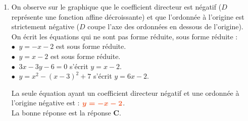 \documentclass[a4paper,11pt]{article}
\begin{document}
\begin{seanceD}{}
\begin{enumerate}
\item On observe sur le graphique que le coefficient directeur est négatif ($D$ représente une fonction affine décroissante) et que l'ordonnée à l'origine est strictement négative ($D$ coupe l'axe des ordonnées en dessous de l'origine).\\On écrit les équations qui ne sont pas forme réduite, sous forme réduite :\\$\bullet\:$ $y=-x-2$ est  sous forme réduite.\\$\bullet\:$ $y=x-2$ est  sous forme réduite.\\$\bullet\:$ $3x-3y-6=0$ s'écrit $y=x-2$.\\$\bullet\:$ $y=x^2-(x-3)^2+7$ s'écrit $y=6x-2$.

\medskip
La seule équation ayant un coefficient directeur négatif et une ordonnée à l'origine négative est : ${\color[HTML]{F15929}\boldsymbol{y=-x-2}}$.\\La bonne réponse est la réponse {\bfseries \color[HTML]{F15929}C}.

\end{enumerate}

\end{seanceD}
\end{document}
